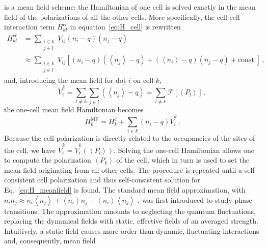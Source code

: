 %
 is a mean field scheme: the Hamiltonian of one cell is solved
exactly in the mean field of the polarizations of all the other cells. More
specifically, the cell-cell interaction term $H^\text{cc}_{kl}$ in
equation~\eqref{eq:H_cell} is rewritten
\begin{equation}
\begin{split}
  \label{eq:H_kl_meanfield}
  H^\text{cc}_{kl} 
  &=
  \sum_{\substack{i \in k\\j \in l}} V_{ij} \left( n_i - q \right) \left( n_j - q \right) \\
  &\approx
  \sum_{\substack{i \in k\\j \in l}} V_{ij} 
       \left[ \left( n_i - q \right) \left( \left< n_j \right> - q \right)
              +
              \left( \left< n_i \right> - q \right) \left( n_j - q \right)
              +
              \text{const.}
       \right] \, ,
\end{split}
\end{equation}
and, introducing the mean field for dot $i$ on cell $k$,
\begin{equation}
  \label{eq:V_meanfield}
  \tilde{V}_i^k
  = \sum_{l \ne k} \sum_{j \in l} \left( \left< n_j \right> - q \right)
  = \sum_{l \ne k} \mathcal{F} \left[ \left< P_l \right> \right] \, ,
\end{equation}
the one-cell mean field Hamiltonian becomes
\begin{equation}
  \label{eq:H_meanfield}
  H^{\mathrm{MF}}_k
  = H^\text{c}_k + \sum_{i \in k} \left( n_i - q \right) \tilde{V}_i^k \, .
\end{equation}
Because the cell polarization is directly related to the occupancies of the
sites of the cell, we have $\tilde{V}_i^k = \tilde{V}_i^k(\left<P_l\right>)$.
Solving the one-cell Hamiltonian allows one to compute the polarization $\left<
P_k \right>$ of the cell, which in turn is used to set the mean field
originating from all other cells. The procedure is repeated until a
self-consistent cell polarization and thus self-consistent solution for
Eq.~\eqref{eq:H_meanfield} is found. The standard mean field approximation, with
$n_i n_j \approx n_i \left< n_j \right> + \left< n_i \right> n_j - 
\left< n_i \right> \left< n_j \right>$
, was first introduced to study phase transitions. The approximation amounts to
neglecting the quantum fluctuations, replacing the dynamical fields with static,
effective fields of an averaged strength. Intuitively, a static field causes
more order than dynamic, fluctuating interactions and, consequently, mean field
